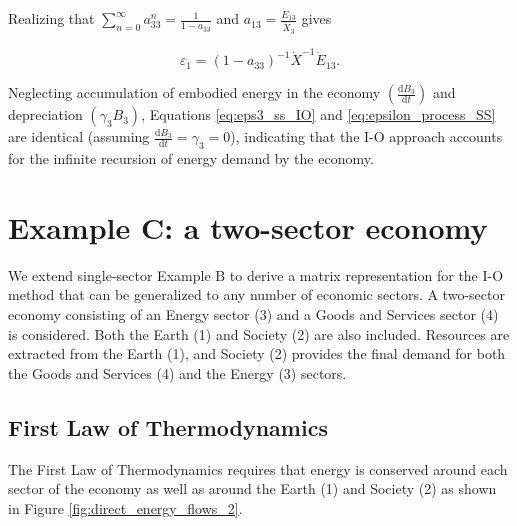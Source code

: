 \documentclass[authoryear,preprint,review,12pt]{elsarticle}
\begin{document}
Realizing that $\sum_{n=0}^{\infty}a_{33}^{n} = \frac{1}{1-a_{33}}$ and $a_{13} = \frac{\dot{E}_{13}}{\dot{X}_{3}}$ gives

\begin{equation} \label{eq:epsilon_process_SS}
	\varepsilon_{1} = (1-a_{33})^{-1} \dot{X}^{-1} \dot{E}_{13}.
\end{equation}

Neglecting accumulation of embodied energy in the economy $\left(\frac{\mathrm{d}B_{3}}{\mathrm{d}t}\right)$ and depreciation $\left(\gamma_{3}B_{3}\right)$, Equations \ref{eq:eps3_ss_IO} and \ref{eq:epsilon_process_SS} are identical (assuming $\frac{\mathrm{d}B_{3}}{\mathrm{d}t} =\gamma_{3} = 0$), indicating that the I-O approach accounts for the infinite recursion of energy demand by the economy.


\section{Example C: a two-sector economy}

We extend single-sector Example B to derive a matrix representation for the I-O method that can be generalized to any number of economic sectors. A two-sector economy consisting of an Energy sector (3) and a Goods and Services sector (4) is considered. Both the Earth (1) and Society (2) are also included. Resources are extracted from the Earth (1), and Society (2) provides the final demand for both the Goods and Services (4) and the Energy (3) sectors.

\subsection{First Law of Thermodynamics}

The First Law of Thermodynamics requires that energy is conserved around each sector of the economy as well as around the Earth (1) and Society (2) as shown in Figure \ref{fig:direct_energy_flows_2}. 
\end{document}
